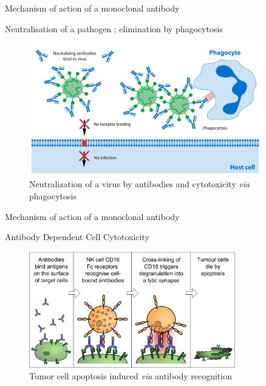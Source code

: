 \begin{frame}{Mechanism of action of a monoclonal antibody}
    \begin{block}{Neutralisation of a pathogen ; elimination by phagocytosis}
        \begin{figure}
            \centering
            \includegraphics[width=0.9\textwidth]{../Images/antibodies_neutralization.jpeg}
            \caption{Neutralization of a virus by antibodies and cytotoxicity \emph{via} phagocytosis}
            \label{fig:neutralization_antibodies}
        \end{figure}
    \end{block}
\end{frame}

\begin{frame}{Mechanism of action of a monoclonal antibody}
    \begin{block}{Antibody Dependent Cell Cytotoxicity}
        \begin{figure}
            \centering
            \includegraphics[width=0.8\textwidth]{../Images/Antibody-dependent_Cellular_Cytotoxicity.svg.png}
            \caption{Tumor cell apoptosis induced \emph{via} antibody recognition}
            \label{fig:ADCC}
        \end{figure}
    \end{block}
\end{frame}

